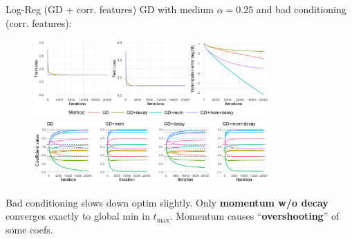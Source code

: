 \documentclass[11pt,compress,t,notes=noshow, xcolor=table]{beamer}
\begin{document}
\begin{vbframe}{Log-Reg (GD + corr. features)}
\vspace{-0.4cm}
GD with medium $\alpha=0.25$ and bad conditioning (corr. features):
\begin{figure}
            \includegraphics[width=0.8\textwidth]{slides/04-multivariate-first-order/figure_man/simu_linmod/GD_log_med_lr_corr_iters.pdf} \\
             \includegraphics[width=0.8\textwidth]{slides/04-multivariate-first-order/figure_man/simu_linmod/GD_log_coef_med_corr.pdf}\\
            \begin{footnotesize}
            \end{footnotesize}
\end{figure}
Bad conditioning slows down optim slightly. Only \textbf{momentum w/o decay} converges exactly to global min in $t_{\text{max}}$. Momentum causes “\textbf{overshooting}” of some coefs.
\end{vbframe}
\end{document}
